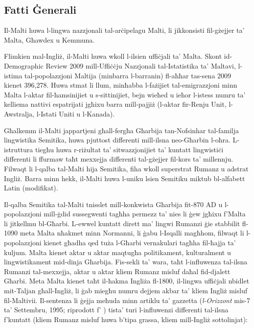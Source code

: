 \documentclass[]{../../metanetpaper}
\begin{document}
\begin{multicols}{2}

\subsection{Fatti Ġenerali}

Il-Malti huwa l-lingwa nazzjonali tal-arċipelagu Malti, li jikkonsisti fil-gżejjer ta’ Malta, Għawdex u Kemmuna.
    
Flimkien mal-Ingliż, il-Malti huwa wkoll l-ilsien uffiċjali ta’ Malta. Skont id-Demographic Review 2009 mill-Uffiċċju Nazzjonali tal-Istatistika ta’ Maltavi, l-istima tal-popolazzjoni Maltija (minbarra l-barranin) fl-aħħar tas-sena 2009 kienet 396,278. Huwa stmat li llum, minħabba l-fażijiet tal-emigrazzjoni minn Malta l-aktar fil-ħamsinijiet u s-sittinijiet, bejn wieħed u ieħor l-istess numru ta’ kelliema nattivi espatrijati jgħixu barra mill-pajjiż (l-aktar fir-Renju Unit, l-Awstralja, l-Istati Uniti u l-Kanada).
    
Għalkemm il-Malti jappartjeni għall-fergħa Għarbija tan-Nofsinhar tal-familja lingwistika Semitika, huwa pjuttost differenti mill-ilsna neo-Għarbin l-oħra. L-istruttura tiegħu huwa r-riżultat ta’ sitwazzjonijiet ta’ kuntatt lingwistiċi differenti li ffurmaw taħt mexxejja differenti tal-gżejjer fil-kors ta' millennju. Filwaqt li l-qalba tal-Malti hija Semitika, fiha wkoll superstrat Rumanz u adstrat Ingliż. Barra minn hekk, il-Malti huwa l-uniku lsien Semitiku miktub bl-alfabett Latin (modifikat).
    
Il-qalba Semitika tal-Malti tnisslet mill-konkwista Għarbija fit-870 AD u l-popolazzjoni mill-ġdid sussegwenti tagħha permezz ta’ nies li ġew jgħixu f’Malta li jitkellmu bl-Għarbi. L-ewwel kuntatt dirett ma’ lingwi Rumanzi ġie stabbilit fl-1090 meta Malta nħakmet minn Normanni, li ġabu l-Isqalli magħhom, filwaqt li l-popolazzjoni kienet għadha qed tuża l-Għarbi vernakulari tagħha fil-ħajja ta’ kuljum. Malta kienet aktar u aktar maqtugħa politikament, kulturalment u lingwistikament mid-dinja Għarbija. Fis-sekli ta’ wara, taħt l-influwenza tal-ilsna Rumanzi tal-mexxejja, aktar u aktar kliem Rumanz misluf daħal fid-djalett Għarbi. Meta Malta kienet taħt il-ħakma Ingliża fl-1800, il-lingwa uffiċjali nbidlet mit-Taljan għall-Ingliż, li ġab miegħu numru dejjem akbar ta’ kliem Ingliż misluf fil-Maltivii. Il-sentenza li ġejja meħuda minn artiklu ta’ gazzetta (\emph{l-Orizzont} mis-7 ta’ Settembru, 1995; riprodott f’ \cite[p. 135]{Ambros:1998}) tista’ turi l-influwenzi differenti tal-ilsna f'kuntatt (kliem Rumanz misluf huwa b’tipa grassa, kliem mill-Ingliż sottolinjat):


\end{multicols}
\end{document}
